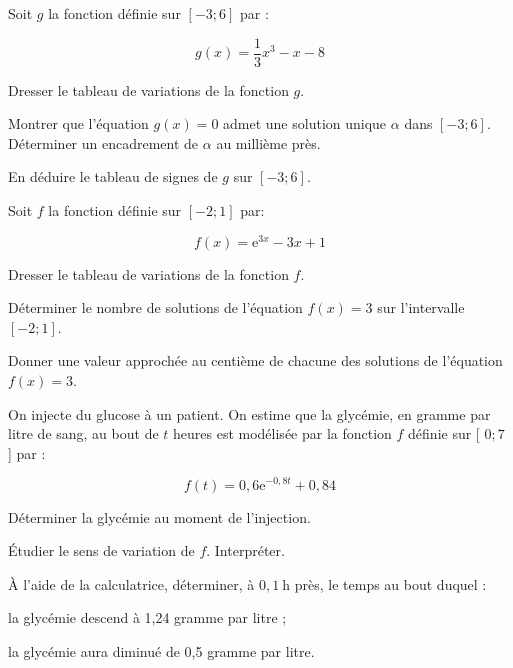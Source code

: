 \documentclass[11pt,a4paper]{article}  %
\begin{document}
\exerciceDS{}

Soit $g$ la fonction définie sur $[-3 ; 6]$ par :

$$
g(x)=\frac{1}{3} x^3-x-8
$$

\begin{enumMet}
	\item Dresser le tableau de variations de la fonction $g$.
	\item Montrer que l'équation $g(x)=0$ admet une solution unique $\alpha$ dans $[-3 ; 6]$. Déterminer un encadrement de $\alpha$ au millième près.
	\item En déduire le tableau de signes de $g$ sur $[-3 ; 6]$.
\end{enumMet}

\exerciceDS{}


Soit $f$ la fonction définie sur $[-2 ; 1]$ par:

$$
f(x)=\mathrm{e}^{3 x}-3 x+1
$$

\begin{enumMet}
	\item Dresser le tableau de variations de la fonction $f$.
	\item Déterminer le nombre de solutions de l'équation $f(x)=3$ sur l'intervalle $[-2 ; 1]$.
	\item Donner une valeur approchée au centième de chacune des solutions de l'équation $f(x)=3$.
\end{enumMet}



\exerciceDS{}

On injecte du glucose à un patient.
On estime que la glycémie, en gramme par litre de sang, au bout de $t$ heures est modélisée par la fonction $f$ définie sur [ $0 ; 7$ ] par :

$$
f(t)=0,6 \mathrm{e}^{-0,8 t}+0,84
$$

\begin{enumMet}
	\item Déterminer la glycémie au moment de l'injection.
	\item Étudier le sens de variation de $f$. Interpréter.
	\item À l'aide de la calculatrice, déterminer, à $0,1 \mathrm{~h}$ près, le temps au bout duquel :
	\begin{enumMet}
		\item la glycémie descend à 1,24 gramme par litre ;
		\item la glycémie aura diminué de 0,5 gramme par litre.
	\end{enumMet}
\end{enumMet}
\end{document}
